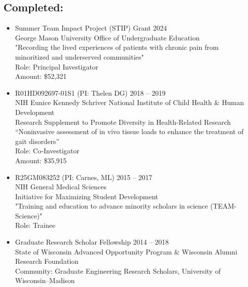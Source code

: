 \documentclass[letterpaper, 10pt]{article}
\begin{document}
\subsection{Completed:}
\begin{itemize}
    \item[] Summer Team Impact Project (STIP) Grant \hfill 2024\\
    George Mason University Office of Undergraduate Education\\
    "Recording the lived experiences of patients with chronic pain from minoritized and underserved communities"\\
    Role: Principal Investigator\\
    Amount: \$52,321\\

    \item[] R01HD092697-01S1 (PI: Thelen DG) \hfill 2018 -- 2019\\ %
    NIH Eunice Kennedy Schriver National Institute of Child Health \& Human Development\\
    Research Supplement to Promote Diversity in Health-Related Research\\
    “Noninvasive assessment of in vivo tissue loads to enhance the treatment of gait disorders”\\
    Role: Co-Investigator\\
    Amount: \$35,915\\
    
    \item[] R25GM083252 (PI: Carnes, ML) \hfill 2015 -- 2017\\
    NIH General Medical Sciences\\
    Initiative for Maximizing Student Development\\
    "Training and education to advance minority scholars in science (TEAM-Science)"\\
    Role: Trainee\\
    
    \item[] Graduate Research Scholar Fellowship \hfill 2014 -- 2018\\
    State of Wisconsin Advanced Opportunity Program \& Wisconsin Alumni Research Foundation\\
    Community: Graduate Engineering Research Scholars, University of Wisconsin--Madison\\

\end{itemize}
\end{document}
